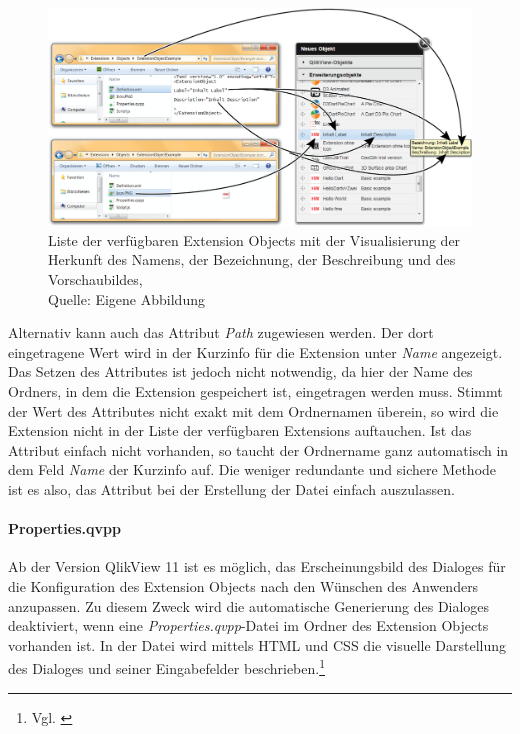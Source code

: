 \begin{figure}[htbp]
	\centering
		\includegraphics[width=1.00\textwidth]{./img/DefUndIcon/DefUndIcon2.png}
	\caption[Liste der verfügbaren Extension Objects]{Liste der verfügbaren Extension Objects mit der Visualisierung der Herkunft des Namens, der Bezeichnung, der Beschreibung und des Vorschaubildes, \\Quelle: Eigene Abbildung}
	\label{fig:DefUndIcon2}
\end{figure}

Alternativ kann auch das Attribut \textit{Path} zugewiesen werden. Der dort eingetragene Wert wird in der Kurzinfo für die Extension unter \textit{Name} angezeigt. Das Setzen des Attributes ist jedoch nicht notwendig, da hier der Name des Ordners, in dem die Extension gespeichert ist, eingetragen werden muss. Stimmt der Wert des Attributes nicht exakt mit dem Ordnernamen überein, so wird die Extension nicht in der Liste der verfügbaren Extensions auftauchen. Ist das Attribut einfach nicht vorhanden, so taucht der Ordnername ganz automatisch in dem Feld \textit{Name} der Kurzinfo auf. Die weniger redundante und sichere Methode ist es also, das Attribut bei der Erstellung der Datei einfach auszulassen.




\paragraph{Properties.qvpp}
\label{lab:PropertiesQvpp} 

Ab der Version QlikView 11 ist es möglich, das Erscheinungs\-bild des Dialoges für die Konfiguration des Extension Objects nach den Wünschen des Anwenders anzupassen. Zu diesem Zweck wird die automatische Generierung des Dialoges deaktiviert, wenn eine \textit{Properties.qvpp}-Datei im Ordner des Extension Objects vorhanden ist. In der Datei wird mittels HTML und CSS die visuelle Darstellung des Dialoges und seiner Eingabefelder beschrieben.\footnote{Vgl. \cite{QlikViewPropertiesPages}}

